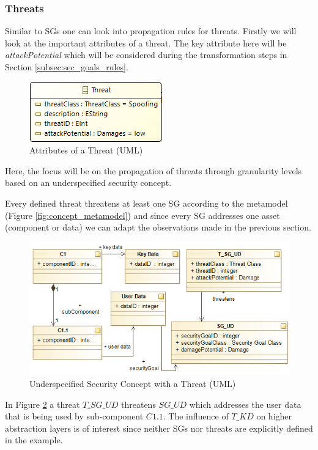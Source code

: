 \subsubsection*{Threats}
\label{subsubsec:threats}

Similar to SGs one can look into propagation rules for threats. Firstly we will look at the important attributes of a threat. The key attribute here will be \textit{attackPotential} which will be considered during the transformation steps in Section \ref{subsec:sec_goals_rules}.  
 
\begin{figure}[H]
\centering
\includegraphics[scale=0.85]{pictures/threat.png}
\caption{Attributes of a Threat (UML)}
\label{fig:threat}
\end{figure} 

Here, the focus will be on the propagation of threats through granularity levels based on an underspecified security concept.

Every defined threat threatens at least one SG according to the metamodel (Figure \ref{fig:concept_metamodel}) and since every SG addresses one asset (component or data) we can adapt the observations made in the previous section. 

\begin{figure}[H]
\centering
\includegraphics[scale=0.85]{pictures/threat_overview.png}
\caption{Underspecified Security Concept with a Threat (UML)}
\label{fig:threat_overview}
\end{figure} 

In Figure \ref{fig:threat_overview} a threat $T\_SG\_UD$ threatens $SG\_UD$ which addresses the user data that is being used by sub-component $C1.1$. The influence of $T\_KD$ on higher abstraction layers is of interest since neither SGs nor threats are explicitly defined in the example.

